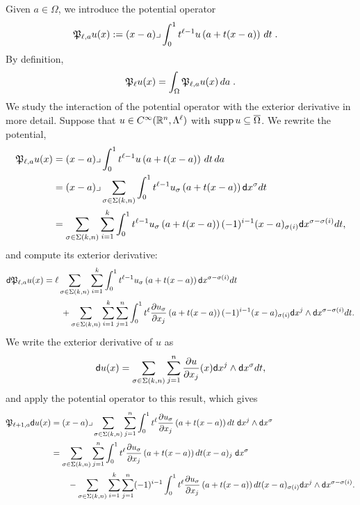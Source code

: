 \documentclass[a4paper]{article}
\begin{document}
Given $a \in \Omega$, we introduce the potential operator 
\begin{align*}
    {\mathfrak P}_{\ell,a} u(x) 
    &:= 
    (x-a)\lrcorner \int_{0}^{1} t^{\ell-1} u\left(a+t(x-a)\right)\,dt\;
    .
\end{align*}
By definition,
\begin{align*}
    {\mathfrak P}_{\ell} u(x) 
    =
    \int_{\Omega} {\mathfrak P}_{\ell,a} u(x) \,da\;
    .
\end{align*}
We study the interaction of the potential operator with the exterior derivative in more detail.
Suppose that $u \in C^{\infty}({\mathbb R}^n,\Lambda^{\ell})$ with $\operatorname{supp} u \subseteq \overline\Omega$.
We rewrite the potential,
\begin{align*}
    {\mathfrak P}_{\ell,a} u(x) 
    &= 
    (x-a)\lrcorner \int_{0}^{1} t^{\ell-1} u\left(a+t(x-a)\right)\,dt\,da\;
    \\&
    = 
    (x-a)\lrcorner 
    \sum_{\sigma \in \Sigma(k,n)}
    \int_{0}^{1} 
    t^{\ell-1} u_{\sigma}\left(a+t(x-a)\right) {\mathsf d}x^{\sigma} dt 
    \\&
    = 
    \sum_{\sigma \in \Sigma(k,n)} \sum_{i=1}^{k}
    \int_{0}^{1} 
    t^{\ell-1} u_{\sigma}\left(a+t(x-a)\right) (-1)^{i-1} (x-a)_{\sigma(i) } {\mathsf d}x^{\sigma-\sigma(i)} dt 
    ,
\end{align*}
and compute its exterior derivative:
\begin{align*}
    {\mathsf d} {\mathfrak P}_{\ell,a} u(x) 
    &= 
    \ell
    \sum_{\sigma \in \Sigma(k,n)} \sum_{i=1}^{k}
    \int_{0}^{1} 
    t^{\ell-1} u_{\sigma}\left(a+t(x-a)\right) {\mathsf d}x^{\sigma-\sigma(i)} dt 
    \\&\qquad
    + 
    \sum_{\sigma \in \Sigma(k,n)} \sum_{i=1}^{k} \sum_{j=1}^{n}
    \int_{0}^{1} 
    t^{\ell} \frac{ \partial u_{\sigma} }{\partial x_{j}}\left(a+t(x-a)\right) (-1)^{i-1} (x-a)_{\sigma(i) } {\mathsf d}x^{j} \wedge {\mathsf d}x^{\sigma-\sigma(i)} dt 
    .
\end{align*}
We write the exterior derivative of $u$ as 
\begin{align*}
    {\mathsf d} u(x)
    =
    \sum_{\sigma \in \Sigma(k,n)} \sum_{j=1}^{n}
    \frac{ \partial u }{\partial x_{j}}(x) {\mathsf d}x^{j} \wedge {\mathsf d}x^{\sigma} dt 
    ,
\end{align*}
and apply the potential operator to this result, which gives 
\begin{align*}
    {\mathfrak P}_{\ell+1,a} {\mathsf d} u(x)
    &=
    (x-a)\lrcorner 
    \sum_{\sigma \in \Sigma(k,n)} \sum_{j=1}^{n}
    \int_{0}^{1} t^{\ell} \frac{ \partial u_{\sigma} }{\partial x_{j}}\left(a+t(x-a)\right) dt 
    \;{\mathsf d}x^{j} \wedge {\mathsf d}x^{\sigma}
    \\&
    = 
    \sum_{\sigma \in \Sigma(k,n)} \sum_{j=1}^{n}
    \int_{0}^{1} t^{\ell} \frac{ \partial u_{\sigma} }{\partial x_{j}}\left(a+t(x-a)\right) dt (x-a)_{j}
    \;{\mathsf d}x^{\sigma}
    \\&\qquad 
    - 
    \sum_{\sigma \in \Sigma(k,n)} \sum_{i=1}^{k} \sum_{j=1}^{n}
    (-1)^{i-1}
    \int_{0}^{1} t^{\ell} \frac{ \partial u_{\sigma} }{\partial x_{j}}\left(a+t(x-a)\right) dt 
    (x-a)_{\sigma(i)} {\mathsf d}x^{j} \wedge {\mathsf d}x^{\sigma-\sigma(i)}
    .
\end{align*}
\end{document}
